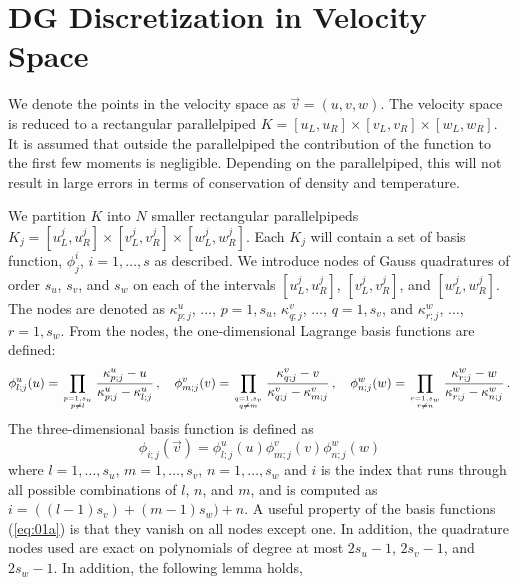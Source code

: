 \documentclass[12pt]{CSUNthesis}
\begin{document}
\section{DG Discretization in Velocity Space}
We denote the points in the velocity space as $\vec{v} = (u,v,w)$. The velocity space is reduced to a rectangular parallelpiped $K=[u_L, u_R] \times [v_L,v_R] \times [w_L,w_R]$. It is assumed that outside the parallelpiped the contribution of the function to the first few moments is negligible. Depending on the parallelpiped, this will not result in large errors in terms of conservation of density and temperature. 

We partition $K$ into $N$ smaller rectangular parallelpipeds $K_j = [u_L^j, u_R^j] \times [v_L^j, v_R^j] \times [w_L^j, w_R^j]$. Each $K_j$ will contain a set of basis function, $\phi_j^i$, $i=1,\dots, s$ as described. We introduce nodes of Gauss quadratures of order $s_u$, $s_v$, and $s_w$ on each of the intervals $[u_L^j,u_R^j]$, $[v_L^j,v_R^j]$, and $[w_L^j,w_R^j]$. The nodes are denoted as
$\kappa^{u}_{p;j}$, $\dots$, $p=1,s_{u}$,
$\kappa^{v}_{q;j}$, $\dots$, $q=1,s_{v}$, and 
$\kappa^{w}_{r;j}$, $\dots$, $r=1,s_{w}$. From the nodes, the one-dimensional Lagrange basis functions are defined:
\begin{equation}
\label{eq:01}
\phi^{u}_{l;j}(u)=\prod_{{p=1,s_{u}} \atop {p\neq l}} \frac{\kappa^{u}_{p;j}-u}{\kappa^{u}_{p;j}-\kappa^{u}_{l;j}}\, ,\quad 
\phi^{v}_{m;j}(v)=\prod_{{q=1,s_{v}} \atop {q\neq m}} \frac{\kappa^{v}_{q;j}-v}{\kappa^{v}_{q;j}-\kappa^{v}_{m;j}}\, ,\quad 
\phi^{w}_{n;j}(w)=\prod_{{r=1,s_{w}} \atop {r\neq n}} \frac{\kappa^{w}_{r;j}-w}{\kappa^{w}_{r;j}-\kappa^{w}_{n;j}}\, .
\end{equation}
The three-dimensional basis function is defined as
\begin{equation}
\label{eq:01a}
\phi_{i;j}(\vec{v})=\phi^{u}_{l;j}(u)\phi^{v}_{m;j}(v)
\phi^{w}_{n;j}(w)
\end{equation} 
where $l=1, \dots , s_u$, 
$m=1,\dots ,s_v$, 
$n=1,\dots ,s_w$ and $i$ 
is the index that runs through all possible combinations of $l$, $n$, and $m$, and is computed as $i=((l-1)s_v)+(m-1)s_w)+n$.  
A useful property of the basis functions (\ref{eq:01a}) is that they vanish on all nodes except one. In addition, the quadrature nodes used are exact on polynomials of degree at most $2s_u-1$, $2s_v-1$, and $2s_w-1$. In addition, the following lemma holds,
\end{document}
